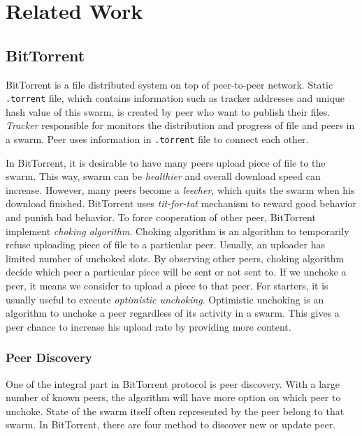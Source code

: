 \chapter{Related Work}
\label{chp:relwork}

\section{BitTorrent}
BitTorrent \cite{2003:bittorrent:cohen} is a file distributed system on top of peer-to-peer network. Static \texttt{.torrent} file, which contains information such as tracker addresses and unique hash value of this swarm, is created by peer who want to publish their files. \textit{Tracker} responsible for monitors the distribution and progress of file and peers in a swarm. Peer uses information in \texttt{.torrent} file to connect each other.

In BitTorrent, it is desirable to have many peers upload piece of file to the swarm. This way, swarm can be \textit{healthier} and overall download speed can increase. However, many peers become a \textit{leecher}, which quits the swarm when his download finished. BitTorrent uses \textit{tit-for-tat} mechanism to reward good behavior and punish bad behavior. To force cooperation of other peer, BitTorrent implement \textit{choking algorithm}. Choking algorithm is an algorithm to temporarily refuse uploading piece of file to a particular peer. Usually, an uploader has limited number of unchoked slots. By observing other peers, choking algorithm decide which peer a particular piece will be sent or not sent to. If we unchoke a peer, it means we consider to upload a piece to that peer. For starters, it is usually useful to execute \textit{optimistic unchoking}. Optimistic unchoking is an algorithm to unchoke a peer regardless of its activity in a swarm. This gives a peer chance to increase his upload rate by providing more content.

\subsection{Peer Discovery}
One of the integral part in BitTorrent protocol is peer discovery. With a large number of known peers, the algorithm will have more option on which peer to unchoke. State of the swarm itself often represented by the peer belong to that swarm. In BitTorrent, there are four method to discover new or update peer. 

